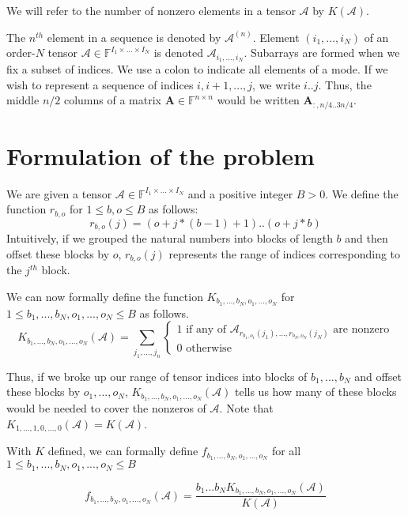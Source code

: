 \documentclass[12pt]{article}
\newcommand{\Mat}[1] {\mathbf{#1}}
\newcommand{\Ten}[1] {\mathbf{\mathcal{#1}}}
\newcommand{\F} {\mathbb{F}}
\begin{document}
    We will refer to the number of nonzero elements in a tensor $\Ten{A}$ by $K(\Ten{A})$.

    The $n^{th}$ element in a sequence is denoted by $\Ten{A}^{(n)}$.
    Element $(i_1, ..., i_N)$ of an order-$N$ tensor $\Ten{A} \in \F^{I_1 \times ... \times I_N}$ is denoted $\Ten{A}_{i_1, ..., i_N}$.
    Subarrays are formed when we fix a subset of indices. We use a colon to indicate all elements of a mode. If we wish to represent a sequence of indices $i, i + 1, ..., j$, we write $i..j$. Thus, the middle $n/2$ columns of a matrix $\Mat{A} \in \F^{n \times n}$ would be written $\Mat{A}_{:, n/4..3n/4}$.

  \section{Formulation of the problem}
    We are given a tensor $\Ten{A} \in \F^{I_1\times ...\times I_N}$ and a positive integer $B > 0$. We define the function $r_{b, o}$ for $1 \leq b, o \leq B$ as follows:
    \[
      r_{b, o}(j) = (o + j * (b - 1) + 1)..(o + j * b)
    \]
    Intuitively, if we grouped the natural numbers into blocks of length $b$ and then offset these blocks by $o$, $r_{b, o}(j)$ represents the range of indices corresponding to the $j^{th}$ block.

    We can now formally define the function $K_{b_1, ..., b_N, o_1, ..., o_N}$ for $1 \leq b_1, ..., b_N, o_1, ..., o_N \leq B$ as follows.
    \[
      K_{b_1, ..., b_N, o_1, ..., o_N}(\Ten{A}) = \sum\limits_{j_1, ..., j_n} \begin{cases}1 \text{ if any of $\Ten{A}_{r_{b_1, o_1}(j_1),  ..., r_{b_N, o_N}(j_N)}$ are nonzero} \\ 0 \text{ otherwise}\end{cases}
    \]

    Thus, if we broke up our range of tensor indices into blocks of $b_1, ..., b_N$ and offset these blocks by $o_1, ..., o_N$, $K_{b_1, ..., b_N, o_1, ..., o_N}(\Ten{A})$ tells us how many of these blocks would be needed to cover the nonzeros of $\Ten{A}$. Note that $K_{1, ..., 1, 0, ..., 0}(\Ten{A}) = K(\Ten{A})$.

    With $K$ defined, we can formally define $f_{b_1, ..., b_N, o_1, ..., o_N}$ for all $1 \leq b_1, ..., b_N, o_1, ..., o_N \leq B$

    \[
      f_{b_1, ..., b_N, o_1, ..., o_N}(\Ten{A}) = \frac{b_1...b_NK_{b_1, ..., b_N, o_1, ..., o_N}(\Ten{A})}{K(\Ten{A})}
    \]
\end{document}
